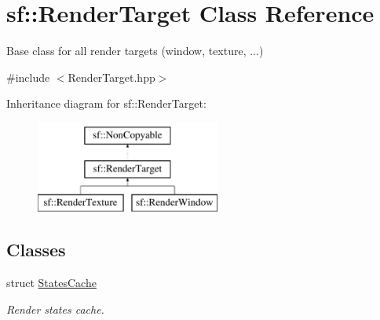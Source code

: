 \hypertarget{classsf_1_1_render_target}{}\section{sf\+:\+:Render\+Target Class Reference}
\label{classsf_1_1_render_target}


Base class for all render targets (window, texture, ...)  




{\ttfamily \#include $<$Render\+Target.\+hpp$>$}

Inheritance diagram for sf\+:\+:Render\+Target\+:\begin{figure}[H]
\begin{center}
\leavevmode
\includegraphics[height=3.000000cm]{classsf_1_1_render_target}
\end{center}
\end{figure}
\subsection*{Classes}
\begin{DoxyCompactItemize}
\item 
struct \mbox{\hyperlink{structsf_1_1_render_target_1_1_states_cache}{States\+Cache}}
\begin{DoxyCompactList}\small\item\em Render states cache. \end{DoxyCompactList}\end{DoxyCompactItemize}
